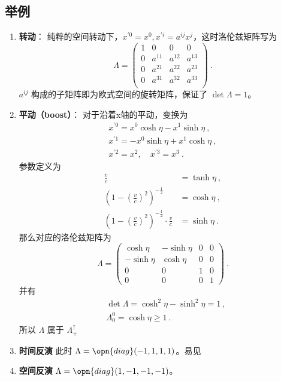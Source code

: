 \subsection{举例}
\begin{enumerate}
\item \textbf{转动}： 纯粹的空间转动下，$x^{\prime 0}=x^{0}, x^{\prime i}=a^{i j} x^{j}$，这时洛伦兹矩阵写为
\begin{equation}       %
\Lambda=\left(                 %
  \begin{array}{cccc}   %
   1& 0 & 0 & 0\\  %
   0& a^{11} &  a^{12} &  a^{13}\\  %
   0& a^{21} &  a^{22} &  a^{23}\\  %
   0& a^{31} &  a^{32} &  a^{33}\\  %
  \end{array}
\right)  ~.               %
\end{equation}
 $a^{ij}$ 构成的子矩阵即为欧式空间的旋转矩阵，保证了 $\det\Lambda=1$。
\item \textbf{平动（boost）}： 对于沿着x轴的平动，变换为
\begin{equation}\begin{array}{c}
x^{\prime 0}=x^{0} \cosh \eta-x^{1} \sinh \eta~, \\
x^{\prime 1}=-x^{0} \sinh \eta+x^{1} \cosh \eta ~,\\
x^{\prime 2}=x^{2}, \quad x^{\prime 3}=x^{3}~.
\end{array}\end{equation}
参数定义为
\begin{equation}
\begin{aligned}
 \frac{v}{c} &=\tanh\eta ~,\\
\left(1-(\frac{v}{c})^2 \right)^{-\frac{1}{2}} &=\cosh\eta~,\\
\left   (1-(\frac{v}{c})^2 \right)^{-\frac{1}{2}}\cdot\frac{v}{c}&=\sinh\eta~. 
\end{aligned}
\end{equation}
那么对应的洛伦兹矩阵为
\begin{equation}\Lambda=\left(\begin{array}{cccc}
\cosh \eta & -\sinh \eta & 0 & 0 \\
-\sinh \eta & \cosh \eta & 0 & 0 \\
0 & 0 & 1 & 0 \\
0 & 0 & 0 & 1
\end{array}\right)~.\end{equation}
并有
\begin{equation}\begin{aligned}
&\det\Lambda=\cosh ^{2} \eta-\sinh ^{2} \eta=1~,\\
&\Lambda_{0}^{0}=\cosh \eta \geqslant 1~.
\end{aligned}\end{equation}
所以 $\Lambda$ 属于 $\Lambda_{+}^{\uparrow}$
\item \textbf{时间反演}
此时 $\Lambda=\opn{diag}(-1,1,1,1)$。易见
\item \textbf{空间反演}
 $\Lambda=\opn{diag}(1,-1,-1,-1)$。
\end{enumerate}


